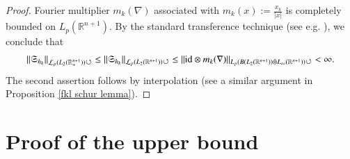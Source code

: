 \documentclass[12pt]{amsart}
\begin{document}
\begin{proof}
Fourier multiplier $m_k(\nabla)$ associated with $m_k(x):=\frac{x_{k}}{|x|}$ is completely bounded on $L_p(\mathbb{R}^{n+1}).$ By the standard transference technique (see e.g.  \cite{MR3378821,MR2866074}), we conclude that
\begin{align*}
\|\mathfrak{S}_{h_k}\|_{\mathcal{L}_p(L_2(\mathbb{R}_+^{n+1}))\circlearrowleft}\leq \|\mathfrak{S}_{h_k}\|_{\mathcal{L}_p(L_2(\mathbb{R}^{n+1}))\circlearrowleft}
\leq\|{\rm id}\otimes m_k(\nabla)\|_{L_p(B(L_2(\mathbb{R}^{n+1}))\bar{\otimes}L_{\infty}(\mathbb{R}^{n+1}))\circlearrowleft}<\infty.
\end{align*}
The second assertion follows by interpolation (see a similar argument in Proposition \ref{fkl schur lemma}).
\end{proof}





\section{Proof of the upper bound}\label{upper bound section}
\setcounter{equation}{0}
\end{document}
